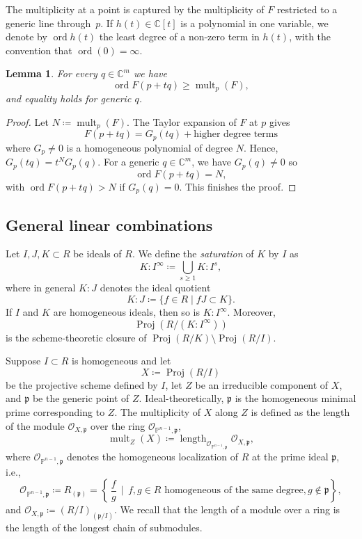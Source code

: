 \documentclass[11pt,letterpaper]{article}
\newtheorem{lemma}[theorem]{Lemma}\AddToHook{env/lemma/begin}{\crefalias{theorem}{lemma}}
\numberwithin{equation}{section}
\newcommand{\PP}{\mathbb{P}}
\newcommand{\CC}{\mathbb{C}}
\newcommand{\fp}{\mathfrak{p}}
\DeclareMathOperator{\length}{length}
\DeclareMathOperator{\Proj}{Proj}
\DeclareMathOperator{\mult}{mult}
\begin{document}
The multiplicity at a point is captured by the multiplicity of $F$ restricted to a generic line through~$p$.
If $h(t)\in\CC[t]$ is a polynomial in one variable, we denote by $\operatorname{ord} h(t)$ the least degree of a non-zero term in $h(t)$, with the convention that $\operatorname{ord}(0)=\infty$.

\begin{lemma}
\label{lem:generic-line}
    For every $q\in\CC^m$ we have \[
    \operatorname{ord} F(p+tq) \geq \mult_{p}(F),
    \] and equality holds for generic $q$.
\end{lemma}
\begin{proof}
Let $N\coloneqq \mult_p(F)$.
    The Taylor expansion of $F$ at $p$ gives \[
    F(p+tq)= G_p(tq) + \text{higher degree terms}
    \] where $G_p\neq 0$ is a homogeneous polynomial of degree $N$.
    Hence, $G_p(tq)=t^{N}G_p(q)$.
    For a generic $q\in\CC^m$, we have $G_p(q)\neq 0$ so \[
    \operatorname{ord} F(p+tq) = N,
    \] with $\operatorname{ord} F(p+tq)> N$ if $G_p(q)=0$.
    This finishes the proof.
\end{proof}

\subsection{General linear combinations}

Let $I,J,K\subset R$ be ideals of $R$.
We define the \emph{saturation} of $K$ by $I$ as
\[
K:I^{\infty} \coloneqq \bigcup_{s\geq 1} K:I^s ,
\] where in general $K:J$ denotes the ideal quotient \[
K:J \coloneqq \{f\in R\mid f J \subset K\}.
\] 
If $I$ and $K$ are homogeneous ideals, then so is $K:I^{\infty}$.
Moreover, \[
\Proj\left(R / (K:I^{\infty})\right)
\] is the scheme-theoretic closure of $\Proj(R/K)\setminus \Proj(R/I)$.

Suppose $I\subset R$ is homogeneous and let \[
X\coloneqq \Proj(R/I)
\] be the projective scheme defined by $I$, let $Z$ be an irreducible component of $X$, and $\fp$ be the generic point of $Z$.
Ideal-theoretically, $\fp$ is the homogeneous minimal prime corresponding to $Z$.
The multiplicity of $X$ along $Z$ is defined as the length of the module $\mathcal{O}_{X,\fp}$ over the ring $\mathcal{O}_{\PP^{n-1},\fp}$, \[
\mult_{Z}(X) \coloneqq \length_{\mathcal{O}_{\PP^{n-1},\fp}}\mathcal{O}_{X,\fp},
\] where $\mathcal{O}_{\PP^{n-1},\fp}$ denotes the homogeneous localization of $R$ at the prime ideal $\fp$, i.e., \[
\mathcal{O}_{\PP^{n-1},\fp} \coloneqq R_{(\fp)} = \left\{\, \frac{f}{g}\,\mid\, f,g\in R \text{ homogeneous of the same degree}, g\not\in\fp\right\},
\]
and $\mathcal{O}_{X,\fp}\coloneqq (R/I)_{(\fp/I)}$.
We recall that the length of a module over a ring is the length of the longest chain of submodules.
\end{document}
